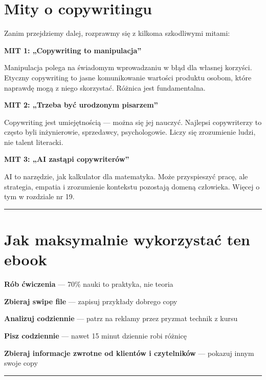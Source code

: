 \documentclass[
  12pt,
  a4paper,
  twoside,
  openright,
  12pt,
  DIV=12,
  BCOR=12mm]{scrbook}
\newcommand{\decoline}{%
  \begin{center}
    \textcolor{bordergray}{\rule{0.3\textwidth}{0.5pt}}
  \end{center}
}
\begin{document}
\section{Mity o copywritingu}\label{mity-o-copywritingu}

Zanim przejdziemy dalej, rozprawmy się z kilkoma szkodliwymi mitami:

\begin{uwaga}
\textbf{MIT 1: „Copywriting to manipulacja”}

Manipulacja polega na świadomym wprowadzaniu w błąd dla własnej korzyści. Etyczny copywriting to jasne komunikowanie wartości produktu osobom, które naprawdę mogą z niego skorzystać. Różnica jest fundamentalna.

\medskip
\textbf{MIT 2: „Trzeba być urodzonym pisarzem”}

Copywriting jest umiejętnością --- można się jej nauczyć. Najlepsi copywriterzy to często byli inżynierowie, sprzedawcy, psychologowie. Liczy się zrozumienie ludzi, nie talent literacki.

\medskip
\textbf{MIT 3: „AI zastąpi copywriterów”}

AI to narzędzie, jak kalkulator dla matematyka. Może przyspieszyć pracę, ale strategia, empatia i zrozumienie kontekstu pozostają domeną człowieka. Więcej o tym w rozdziale nr 19.
\end{uwaga}

\decoline

\section{Jak maksymalnie wykorzystać ten
ebook}\label{jak-maksymalnie-wykorzystaux107-ten-ebook}

\begin{checklist}
  \item \textbf{Rób ćwiczenia} --- 70\% nauki to praktyka, nie teoria
  \item \textbf{Zbieraj swipe file} --- zapisuj przykłady dobrego copy
  \item \textbf{Analizuj codziennie} --- patrz na reklamy przez pryzmat technik z kursu
  \item \textbf{Pisz codziennie} --- nawet 15 minut dziennie robi różnicę
  \item \textbf{Zbieraj informacje zwrotne od klientów i czytelników} --- pokazuj innym swoje copy
\end{checklist}

\decoline
\end{document}
